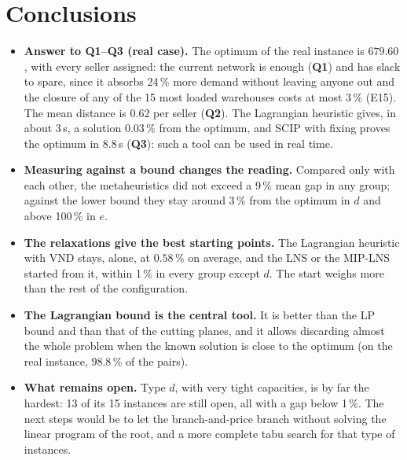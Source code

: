 \documentclass[11pt,a4paper]{article}
\begin{document}
\section{Conclusions}\label{sec:concl}
\begin{itemize}
  \item \textbf{Answer to Q1--Q3 (real case).} The optimum of the real instance is $679.60$, with
        every seller assigned: the current network is enough (\textbf{Q1}) and has slack to spare,
        since it absorbs 24\,\% more demand without leaving anyone out and the closure of any of
        the 15 most loaded warehouses costs at most 3\,\% (E15). The mean distance is $0.62$ per
        seller (\textbf{Q2}). The Lagrangian heuristic gives, in about 3\,s, a solution $0.03\,\%$
        from the optimum, and SCIP with fixing proves the optimum in $8.8$\,s (\textbf{Q3}): such a
        tool can be used in real time.
  \item \textbf{Measuring against a bound changes the reading.} Compared only with each other, the
        metaheuristics did not exceed a 9\,\% mean gap in any group; against the lower bound they
        stay around 3\,\% from the optimum in $d$ and above 100\,\% in $e$.
  \item \textbf{The relaxations give the best starting points.} The Lagrangian heuristic with VND
        stays, alone, at $0.58\,\%$ on average, and the LNS or the MIP-LNS started from it, within
        1\,\% in every group except $d$. The start weighs more than the rest of the configuration.
  \item \textbf{The Lagrangian bound is the central tool.} It is better than the LP bound and than
        that of the cutting planes, and it allows discarding almost the whole problem when the
        known solution is close to the optimum (on the real instance, $98.8\,\%$ of the pairs).
  \item \textbf{What remains open.} Type $d$, with very tight capacities, is by far the hardest: 13
        of its 15 instances are still open, all with a gap below 1\,\%. The next steps would be to
        let the branch-and-price branch without solving the linear program of the root, and a more
        complete tabu search for that type of instances.
\end{itemize}
\end{document}
